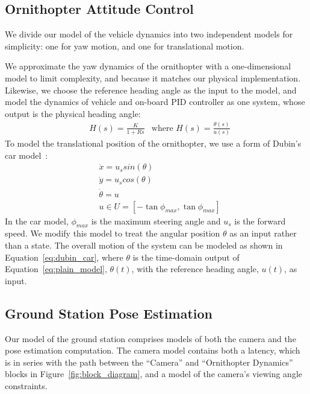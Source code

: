 \documentclass{aamas2013}
\begin{document}
\subsection{Ornithopter Attitude Control}
\label{sec:model_attitude}

We divide our model of the vehicle dynamics into two independent models for 
simplicity: one for yaw motion, and one for translational motion.

We approximate the yaw dynamics of the ornithopter with a one-dimensional 
model to limit complexity, and because it matches our physical 
implementation. Likewise, we choose the reference heading angle as the input to 
the model, and model the dynamics of vehicle and on-board PID controller as 
one system, whose output is the physical heading angle:
\begin{equation}
\label{eq:plain_model}
\begin{aligned}
& H(s) = \frac{K}{1 + Rs}
& \text{where }H(s) = \frac{\theta(s)}{u(s)}
\end{aligned}
\end{equation}
To model the translational position of the ornithopter, we use a form of 
Dubin's car model~\cite{lavalle:planning}: 
\begin{equation}
\label{eq:dubin_car}
\begin{aligned}
& \dot{x} = u_{s}sin(\theta)\\
& \dot{y} = u_{s}cos(\theta)\\
& \dot{\theta} = u\\
& u \in U=[-\tan{\phi_{max}},\tan{\phi_{max}}]
\end{aligned}
\end{equation} 
In the car model, $\phi_{max}$ is the maximum steering angle and $u_{s}$ is
the forward speed. We modify this model to treat the angular position $\theta$
as an input rather than a state. The overall motion of the system can be
modeled as shown in Equation~\ref{eq:dubin_car}, where $\theta$ is the
time-domain output of Equation~\ref{eq:plain_model}, $\theta(t)$, with the
reference heading angle, $u(t)$, as input.

\subsection{Ground Station Pose Estimation}

Our model of the ground station comprises models of both the camera and the
pose estimation computation. The camera model contains both a latency, which 
is in series with the path between the ``Camera'' and 
``Ornithopter Dynamics'' blocks in Figure~\ref{fig:block_diagram}, and a 
model of the camera's viewing angle constraints.
 
\end{document}
